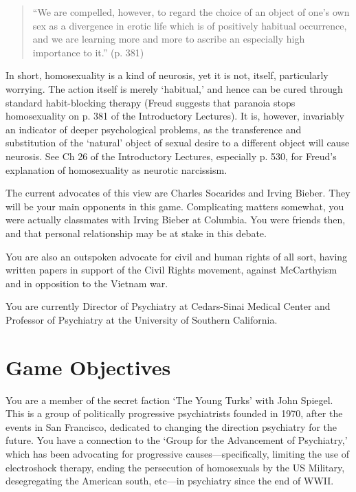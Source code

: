 \begin{refsection}
\begin{quote}

“We are compelled, however, to regard the choice of an object of one's own sex as a divergence in erotic life which is of positively habitual occurrence, and we are learning more and more to ascribe an especially high importance to it.” (p. 381)
\end{quote}

In short, homosexuality is a kind of neurosis, yet it is not, itself, particularly worrying. The action itself is merely `habitual,' and hence can be cured through standard habit-blocking therapy (Freud suggests that paranoia stops homosexuality on p. 381 of the Introductory Lectures). It is, however, invariably an indicator of deeper psychological problems, as the transference and substitution of the `natural' object of sexual desire to a different object will cause neurosis. See Ch 26 of the Introductory Lectures, especially p. 530, for Freud's explanation of homosexuality as neurotic narcissism.

The current advocates of this view are Charles Socarides and Irving Bieber. They will be your main opponents in this game. Complicating matters somewhat, you were actually classmates with Irving Bieber at Columbia. You were friends then, and that personal relationship may be at stake in this debate.

You are also an outspoken advocate for civil and human rights of all sort, having written papers in support of the Civil Rights movement, against McCarthyism and in opposition to the Vietnam war.

You are currently Director of Psychiatry at Cedars-Sinai Medical Center and Professor of Psychiatry at the University of Southern California.

\section{Game Objectives}
\label{gameobjectives}

You are a member of the secret faction `The Young Turks' with John Spiegel. This is a group of politically progressive psychiatrists founded in 1970, after the events in San Francisco, dedicated to changing the direction psychiatry for the future. You have a connection to the `Group for the Advancement of Psychiatry,' which has been advocating for progressive causes—specifically, limiting the use of electroshock therapy, ending the persecution of homosexuals by the US Military, desegregating the American south, etc—in psychiatry since the end of WWII. 


\end{refsection}
